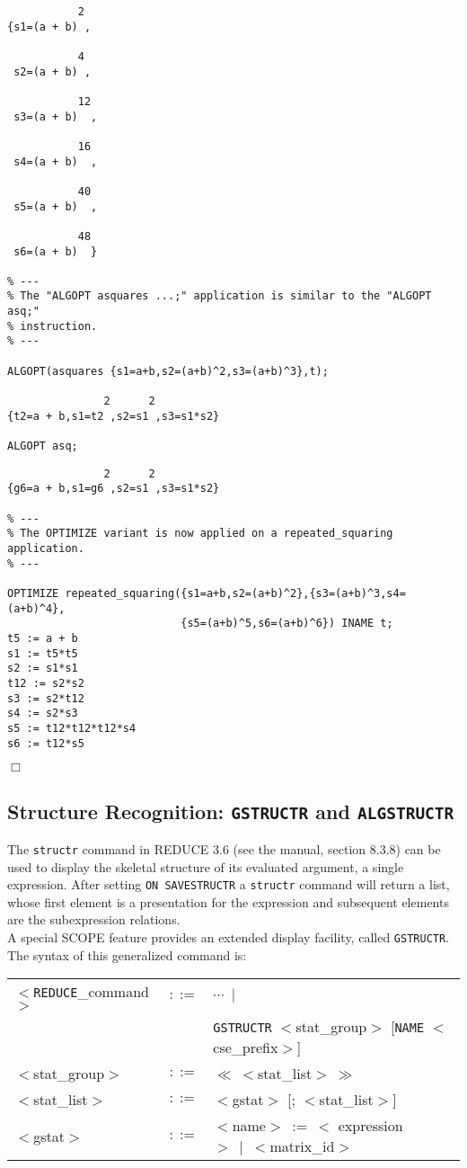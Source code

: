 {\begin{verbatim}
           2
{s1=(a + b) ,

           4
 s2=(a + b) ,

           12
 s3=(a + b)  ,

           16
 s4=(a + b)  ,

           40
 s5=(a + b)  ,

           48
 s6=(a + b)  }

% ---
% The "ALGOPT asquares ...;" application is similar to the "ALGOPT asq;"
% instruction.
% ---

ALGOPT(asquares {s1=a+b,s2=(a+b)^2,s3=(a+b)^3},t);

               2      2
{t2=a + b,s1=t2 ,s2=s1 ,s3=s1*s2}

ALGOPT asq;
\end{verbatim}}
\newpage
{\small
\begin{verbatim}
               2      2
{g6=a + b,s1=g6 ,s2=s1 ,s3=s1*s2}

% ---
% The OPTIMIZE variant is now applied on a repeated_squaring application.
% ---

OPTIMIZE repeated_squaring({s1=a+b,s2=(a+b)^2},{s3=(a+b)^3,s4=(a+b)^4},
                           {s5=(a+b)^5,s6=(a+b)^6}) INAME t;
t5 := a + b
s1 := t5*t5
s2 := s1*s1
t12 := s2*s2
s3 := s2*t12
s4 := s2*s3
s5 := t12*t12*t12*s4
s6 := t12*s5
\end{verbatim}
\begin{flushright}
$\Box$
\end{flushright}}

\subsection{Structure Recognition: 
{\tt GSTRUCTR} and {\tt ALGSTRUCTR}} \label{SSF:sr}

The {\tt structr} command in REDUCE 3.6 (see the manual, section 8.3.8)
can be used
to display the skeletal structure of its evaluated argument, a single 
expression. After setting {\tt ON SAVESTRUCTR} a {\tt structr} command 
will return a list, whose first element is a presentation for the expression 
and subsequent elements are the subexpression relations.\\
A special SCOPE feature provides an extended display facility, called
{\tt GSTRUCTR}. The syntax of this generalized command is:

\begin{center}
\begin{tabular}{lcl}
$<${\tt REDUCE}\_command$>$ & $::=$ & $\cdots~\mid$\\
& & {\tt GSTRUCTR} $<$stat\_group$>$ [{\tt NAME} $<$cse\_prefix$>$]\\ 
$<$stat\_group$>$ & $::=$ & $\ll~<$stat\_list$>~\gg$\\
$<$stat\_list$>$ & $::=$ & $<$gstat$>$ [; $<$stat\_list$>$]\\
$<$gstat$>$ & $::=$ & $<$name$>~:=~<$ expression$>~\mid~<$matrix\_id$>$
\end{tabular}
\end{center}

